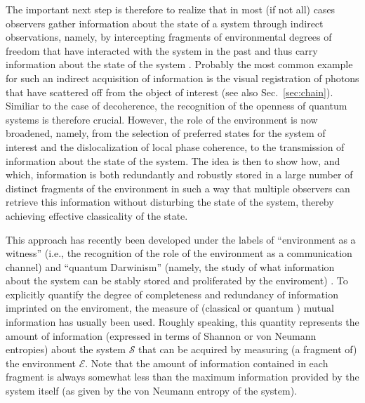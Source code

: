 \documentclass[12pt,aps,floatfix,amsmath,amssymb,showpacs,nofootinbib]{revtex4-2}
\begin{document}
The important next step is therefore to realize that in most (if not
all) cases observers gather information about the state of a system
through indirect observations, namely, by intercepting fragments of
environmental degrees of freedom that have interacted with the system
in the past and thus carry information about the state of the system
\cite{Zurek:1993:pu,Zurek:1998:re,Zurek:2000:tr,Zurek:2002:ii}.
Probably the most common example for such an indirect acquisition of
information is the visual registration of photons that have scattered
off from the object of interest (see also Sec.~\ref{sec:chain}).
Similiar to the case of decoherence, the recognition of the openness
of quantum systems is therefore crucial.  However, the role of the
environment is now broadened, namely, from the selection of preferred
states for the system of interest and the dislocalization of local
phase coherence, to the transmission of information about the state of
the system. The idea is then to show how, and which, information is both
redundantly and robustly stored in a large number of distinct
fragments of the environment in such a way that multiple observers can
retrieve this information without disturbing the state of the system,
thereby achieving effective classicality of the state. 

This approach has recently been developed under the labels of
``environment as a witness'' (i.e., the recognition of the role of the
environment as a communication channel) and ``quantum Darwinism''
(namely, the study of what information about the system can be stably
stored and proliferated by the enviroment)
\cite{Zurek:1993:pu,Zurek:1998:re,Zurek:2002:ii,Zurek:2003:pl,Ollivier:2003:za,%
  Ollivier:2004:im,Blume:2004:oo,Blume:2005:oo}.  To explicitly
quantify the degree of completeness and redundancy of information
imprinted on the enviroment, the measure of (classical
\cite{Ollivier:2003:za,Ollivier:2004:im} or quantum
\cite{Zurek:2002:ii,Blume:2004:oo,Blume:2005:oo}) mutual information
has usually been used.  Roughly speaking, this quantity represents the
amount of information (expressed in terms of Shannon or von Neumann
entropies) about the system $\mathcal{S}$ that can be acquired by
measuring (a fragment of) the environment $\mathcal{E}$.  Note that
the amount of information contained in each fragment is always
somewhat less \cite{Blume:2005:oo} than the maximum information
provided by the system itself (as given by the von Neumann entropy of
the system).
\end{document}

